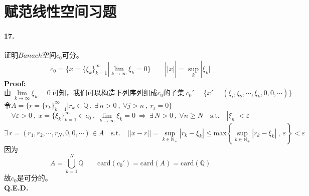 \section{赋范线性空间习题}
\paragraph*{17.}证明$Banach$空间$c_0$可分。
\[c_0=\{x=\{\xi_k\}_{k=1}^{\infty}|\lim_{k \to \infty}\xi_k=0\} \qquad ||x||=\mathop \text{sup}\limits_{k}|\xi_k|\]
\textbf{Proof:}\\
\[\text{由} \ \lim_{k \to \infty}\xi_k=0 \ \text{可知，我们可以构造下列序列组成$c_0$的子集} \ c_0'=\{x'=(\xi_i,\xi_2,\cdots,\xi_k,0,0,\cdots)\}\]
令$A=\{r=\{r_k\}_{k=1}^{\infty}|r_k \in \mathbb{Q} \ , \ \exists \, n>0 \ , \ \forall j>n \ , \ r_j=0\}$
\[\forall \varepsilon>0 \ , \ x=\{\xi_k\}_{k=1}^{\infty} \in c_0 \ , \ \lim_{k \to \infty}\xi_k=0 \ \Rightarrow \ \exists \, N>0 \ , \ \forall n \geq N \quad \text{s.t.} \quad |\xi_n|<\varepsilon\]
\[\exists \, r=(r_1,r_2,\cdots,r_N,0,0,\cdots) \in A \quad \text{s.t.} \quad ||x-r||=\mathop \text{sup}\limits_{k \in \mathbb{N}_+}|r_k-\xi_k| \leq \text{max}\left\{\mathop \text{sup}\limits_{k \in \mathbb{N}_+}|r_k-\xi_k| \ , \ \varepsilon\right\}<\varepsilon\]
因为
\[A=\bigcup_{k=1}^N\mathbb{Q} \qquad \text{card}(c_0')=\text{card}(A)=\text{card}(\mathbb{Q})\]
故$c_0$是可分的。\\
\textbf{Q.E.D.}

